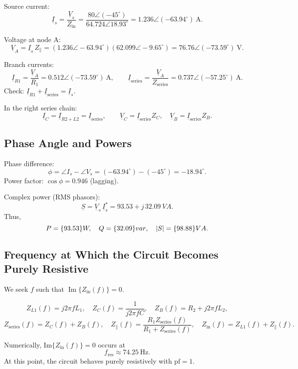 \documentclass{article}
\begin{document}
Source current:
\[
\underline{I}_s = \frac{\underline{V}_s}{Z_{\text{in}}}
= \frac{80\angle(-45^\circ)}{64.724\angle 18.93^\circ}
= 1.236\angle(-63.94^\circ)\ \si{\ampere}.
\]

Voltage at node A:
\[
\underline{V}_A = \underline{I}_s\,Z_{\parallel}
= (1.236\angle -63.94^\circ)(62.099\angle -9.65^\circ)
= 76.76\angle(-73.59^\circ)\ \si{\volt}.
\]

Branch currents:
\[
\underline{I}_{R1} = \frac{\underline{V}_A}{R_1} = 0.512\angle(-73.59^\circ)\ \si{\ampere},\qquad
\underline{I}_{\text{series}} = \frac{\underline{V}_A}{Z_{\text{series}}} = 0.737\angle(-57.25^\circ)\ \si{\ampere}.
\]
Check: $\underline{I}_{R1} + \underline{I}_{\text{series}} = \underline{I}_s$.

In the right series chain:
\[
\underline{I}_C = \underline{I}_{R2+L2} = \underline{I}_{\text{series}},
\qquad
\underline{V}_C = \underline{I}_{\text{series}} Z_C, \quad
\underline{V}_B = \underline{I}_{\text{series}} Z_B.
\]

\subsection{Phase Angle and Powers}

Phase difference:
\[
\phi = \angle I_s - \angle V_s = (-63.94^\circ) - (-45^\circ) = -18.94^\circ.
\]
Power factor: $\cos\phi = 0.946$ (lagging).

Complex power (RMS phasors):
\[
\underline{S} = \underline{V}_s\,\underline{I}_s^{*} = 93.53 + j\,32.09\ \si{VA}.
\]
Thus,
\[
P = \qty{93.53}{W}, \quad Q = \qty{32.09}{var}, \quad \abs{S} = \qty{98.88}{VA}.
\]

\subsection{Frequency at Which the Circuit Becomes Purely Resistive}

We seek $f$ such that $\operatorname{Im}\{Z_{\text{in}}(f)\} = 0$.

\[
Z_{L1}(f)=j2\pi f L_1, \quad
Z_C(f)=\frac{1}{j2\pi f C}, \quad
Z_B(f)=R_2 + j2\pi f L_2,
\]
\[
Z_{\text{series}}(f)=Z_C(f)+Z_B(f), \quad
Z_{\parallel}(f)=\frac{R_1 Z_{\text{series}}(f)}{R_1+Z_{\text{series}}(f)}, \quad
Z_{\text{in}}(f)=Z_{L1}(f)+Z_{\parallel}(f).
\]

Numerically, $\text{Im}\{Z_{\text{in}}(f)\}=0$ occurs at
\[
f_{\text{res}} \approx \qty{74.25}{\hertz}.
\]
At this point, the circuit behaves purely resistively with $\text{pf}=1$.
\end{document}
